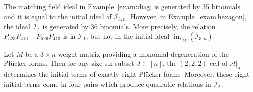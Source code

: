 \documentclass[ALCO,ThmDefs,Unicode,epreuves]{cedram}
\DeclareMathOperator{\ini}{in}
\newcommand{\I}{\mathcal{I}}
\begin{document}
\begin{exam}
The matching field ideal in Example~\ref{exam:diag} is generated by 35 binomials and it is equal to the initial ideal of $\I_{3,n}$.
However, in Example~\ref{exam:hexagon}, the ideal $\I_\Lambda$ is generated by 36 binomials. More precisely, the relation $P_{523}P_{416}-P_{526}P_{413}$ is in $\I_\Lambda$, but not in the initial ideal $\ini_{w_M}(\I_{3,n})$.
\end{exam}


\begin{lemm}\label{lem:222}
Let $M$ be a $3 \times n$ weight matrix providing a monomial degeneration of the Pl{\"u}cker forms. 
Then for any size six subset $J \subset [n]$, the $(2, 2, 2)$-cell of $\mathcal{A}|_J$ determines
 the initial terms of exactly eight Pl{\"u}cker forms. 
 Moreover, these eight initial terms come in four pairs which produce 
 quadratic relations in $\I_{\Lambda}$. 
 

\end{lemm}
\end{document}
